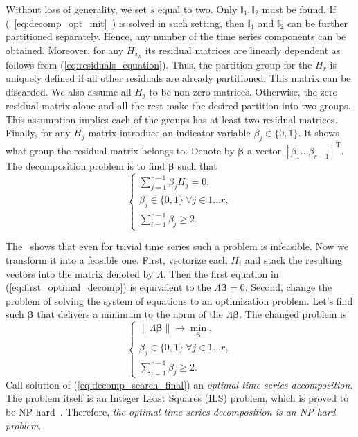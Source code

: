 \documentclass[referee, pdflatex, sn-mathphys-num]{sn-jnl}
\theoremstyle{definition}
\theoremstyle{plain}
\begin{document}
	Without loss of generality, we set $ s $ equal to two. Only $ \mathbb{I}_1, \mathbb{I}_2 $ must be found. If (~\ref{eq:decomp_opt_init}~) is solved in such setting, then $ \mathbb{I}_1 $ and $ \mathbb{I}_2 $ can be further partitioned separately. Hence, any number of the time series components can be obtained. Moreover, for any $ H_{x_k} $ its residual matrices are linearly dependent as follows from (\ref{eq:residuals_equation}). Thus, the partition group for the $ H_r $ is uniquely defined if all other residuals are already partitioned. This matrix can be discarded. We also assume all $ H_j $ to be non-zero matrices. Otherwise, the zero residual matrix alone and all the rest make the desired partition into two groups. This assumption implies each of the groups has at least two residual matrices. Finally, for any $ H_j $ matrix introduce an indicator-variable $ \beta_j \in \{0, 1\} $. It shows what group the residual matrix belongs to. Denote by $ \boldsymbol{\beta} $ a vector $ [\beta_1 \ldots \beta_{r-1}]^{\text{T}} $. The decomposition problem is to find $ \boldsymbol{\beta} $ such that \begin{equation}\label{eq:first_optimal_decomp}
		\begin{cases*}
			\sum\limits_{j = 1}^{r - 1} \beta_j H_j = 0, \\
			\beta_j \in \{0, 1\} \ \forall j \in 1 \ldots r, \\
			\sum\limits_{i = 1}^{r - 1} \beta_j \ge 2.
		\end{cases*}
	\end{equation} 
	
	The~\cite{ecfb9dc578be43ae9ee8fc88b8ff9151} shows that even for trivial time series such a problem is infeasible. Now we transform it into a feasible one. First, vectorize each $ H_i $ and stack the resulting vectors into the matrix denoted by $ \Lambda $. Then the first equation in (\ref{eq:first_optimal_decomp}) is equivalent to the $ \Lambda \boldsymbol{\beta} = 0 $. Second, change the problem of solving the system of equations to an optimization problem. Let's find such $ \boldsymbol{\beta} $ that delivers a minimum to the norm of the $ \Lambda \boldsymbol{\beta} $. The changed problem is \begin{equation}\label{eq:decomp_search_final}
		\begin{cases*}
			\lVert \Lambda \boldsymbol{\beta} \rVert \to \underset{\boldsymbol{\beta}}{\min}, \\
			\beta_j \in \{0, 1\} \ \forall j \in 1 \ldots r, \\
			\sum\limits_{i = 1}^{r - 1} \beta_j \ge 2.
		\end{cases*}
	\end{equation} Call solution of (\ref{eq:decomp_search_final}) an \emph{optimal time series decomposition}. The problem itself is an Integer Least Squares (ILS) problem, which is proved to be NP-hard~\cite{van1981another}. Therefore, \emph{the optimal time series decomposition is an NP-hard problem}.
	
\end{document}

